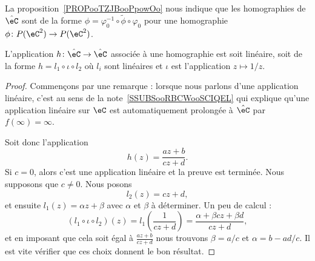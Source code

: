\begin{normaltext}      \label{NORMooCVYKooYvjIeE}
	La proposition~\ref{PROPooTZJBooPpowOo} nous indique que les homographies de \( \hat \eC\) sont de la forme \( \phi=\varphi_0^{-1}\circ\tilde \phi\circ\varphi_0\) pour une homographie \( \phi\colon P(\eC^2)\to P(\eC^2)\).
\end{normaltext}

\begin{proposition}      \label{PROPooSQFOooRginjJ}
	L'application \( h\colon \hat\eC\to \hat \eC\) associée à une homographie est soit linéaire, soit de la forme \( h=l_1\circ \iota\circ l_2\) où \( l_i\) sont linéaires et \( \iota\) est l'application \( z\mapsto 1/z\).
\end{proposition}

\begin{proof}
	Commençons par une remarque : lorsque nous parlons d'une application linéaire, c'est au sens de la note~\ref{SSUBSooRBCWooSCIQEL} qui explique qu'une application linéaire sur \( \eC\) est automatiquement prolongée à \( \hat \eC\) par \( f(\infty)=\infty\).

	Soit donc l'application
	\begin{equation}
		h(z)=\frac{ az+b }{ cz+d }.
	\end{equation}
	Si \( c=0\), alors c'est une application linéaire et la preuve est terminée. Nous supposons que \( c\neq 0\). Nous posons
	\begin{equation}
		l_2(z)=cz+d,
	\end{equation}
	et ensuite \( l_1(z)=\alpha z+\beta\) avec \( \alpha\) et \( \beta\) à déterminer. Un peu de calcul :
	\begin{equation}
		(l_1\circ \iota\circ l_2)(z)=l_1\left( \frac{1}{ cz+d } \right)=\frac{ \alpha+\beta c z+\beta d }{ cz+d },
	\end{equation}
	et en imposant que cela soit égal à \( \frac{ az+b }{ cz+d }\) nous trouvons \( \beta=a/c\) et \( \alpha=b-ad/c\). Il est vite vérifier que ces choix donnent le bon résultat.
\end{proof}

